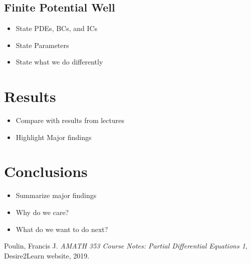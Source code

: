 \documentclass[12pt]{article}
\begin{document}
\subsection{Finite Potential Well}
\hrulefill


\begin{itemize}
    \item State PDEs, BCs, and ICs
    \item State Parameters
    \item State what we do differently
\end{itemize}


\section{Results}



\hrulefill
\begin{itemize}
    \item Compare with results from lectures
    \item Highlight Major findings
\end{itemize}


\section{Conclusions}

\hrulefill
\begin{itemize}
    \item Summarize major findings
    \item Why do we care?
    \item What do we want to do next?
\end{itemize}


\cleardoublepage


\begin{thebibliography}{10}
 Poulin, Francis J. \emph{AMATH 353 Course Notes: Partial Differential Equations 1}, Desire2Learn website, 2019.
\end{thebibliography}
\end{document}
